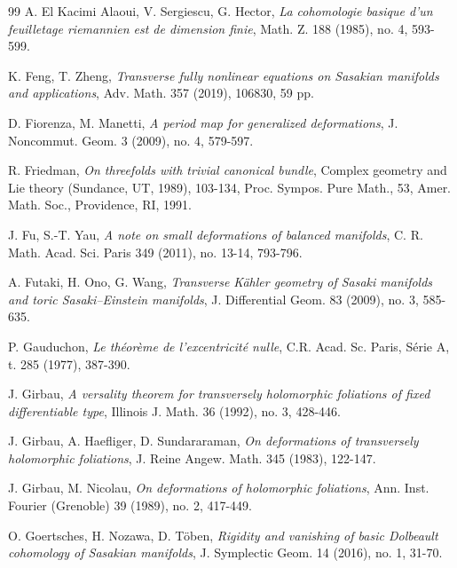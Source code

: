 \documentclass[12pt]{amsart}
\numberwithin{equation}{section}
\theoremstyle{definition}
\theoremstyle{definition}
\theoremstyle{definition}
\renewcommand{\1}{\mathsf{1}}
\renewcommand{\>}{\rightarrow}
\theoremstyle{plain} %
\theoremstyle{plain} %
\theoremstyle{plain} %
\begin{document}
\begin{thebibliography}{99}
		 A. El Kacimi Alaoui, V. Sergiescu, G. Hector,
		\newblock\textit{La cohomologie basique d'un feuilletage riemannien est de dimension finie},
		\newblock Math. Z. 188 (1985), no. 4, 593-599. 		
		
		 K. Feng, T. Zheng,
		\newblock\textit{Transverse fully nonlinear equations on Sasakian manifolds and applications},
		\newblock Adv. Math. 357 (2019), 106830, 59 pp.
		
		
		D. Fiorenza, M. Manetti,
		\newblock\textit{A period map for generalized deformations},
		\newblock J. Noncommut. Geom. 3 (2009), no. 4, 579-597.
		
		 R. Friedman,
		\newblock \textit{On threefolds with trivial canonical bundle},
		\newblock Complex geometry and Lie theory (Sundance, UT, 1989), 103-134,
		Proc. Sympos. Pure Math., 53, Amer. Math. Soc., Providence, RI,
		1991.
		
		
		
		 J. Fu, S.-T. Yau,
		\newblock \textit{A note on small deformations of
			balanced manifolds},
		\newblock  C. R. Math. Acad. Sci. Paris 349 (2011), no. 13-14, 793-796.
		
		 A. Futaki, H. Ono,
		G. Wang,
		\textit{Transverse K\"ahler geometry of Sasaki manifolds and toric Sasaki--Einstein manifolds},
		J. Differential Geom. 83 (2009), no. 3, 585-635.
		
		
		
		
		P. Gauduchon,
		\textit{Le th\'eor\`eme de l’excentricit\'e nulle},
		C.R. Acad. Sc. Paris, S\'erie A, t. 285 (1977), 387-390.
		
		 J. Girbau,
		\newblock\textit{A versality theorem for transversely holomorphic foliations of fixed differentiable type},
		\newblock Illinois J. Math. 36 (1992), no. 3, 428-446.
		
		J. Girbau, A. Haefliger, D. Sundararaman,
		\newblock\textit{On deformations of transversely holomorphic foliations},
		\newblock J. Reine Angew. Math. 345 (1983), 122-147.
		
		 J. Girbau, M. Nicolau,
		\newblock\textit{On deformations of holomorphic foliations},
		\newblock Ann. Inst. Fourier (Grenoble) 39 (1989), no. 2, 417-449.
		
		
		
			O. Goertsches, H. Nozawa, D. T\"oben,
		\textit{Rigidity and vanishing of basic Dolbeault cohomology of Sasakian manifolds},
		J. Symplectic Geom. 14 (2016), no. 1, 31-70.
		

\end{thebibliography}
\end{document}
